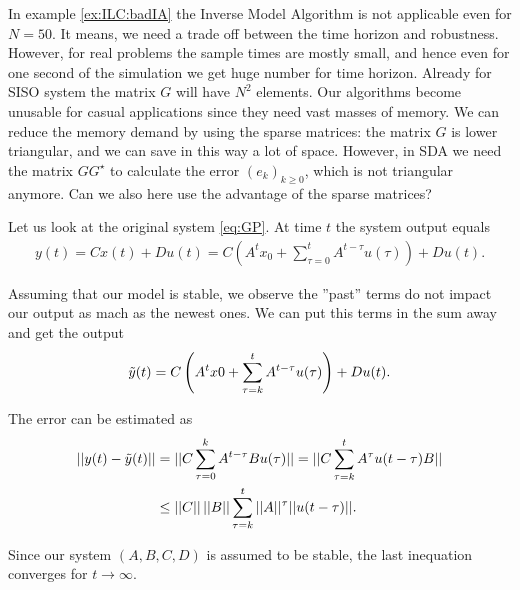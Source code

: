 	In example \ref{ex:ILC:badIA} the Inverse Model Algorithm is not applicable even for $N = 50$. 
	It means, we need a trade off between the time horizon and robustness.
	However, for real problems the sample times are mostly small, and hence even for one second of the simulation we get huge number for time horizon. Already for SISO system the matrix $G$ will have $N^2$ elements. Our algorithms become unusable for casual applications since they need vast masses of memory.	We can reduce the memory demand by using the sparse matrices: the matrix $G$ is lower triangular, and we can save in this way a lot of space. However, in SDA we need the matrix $G G^{\star}$ to calculate the error $(e_k)_{k\geq0}$, which is not triangular anymore. Can we also here use the advantage of the sparse matrices? 
	
	Let us look at the original system \ref{eq:GP}. At time $t$ the system output equals 
	\begin{align}
	y(t) = C x(t) + D u(t) = C(A^t x_0 + \sum_{\tau = 0}^t A^{t - \tau} u(\tau)) + D u(t).
	\end{align}
	
	Assuming that our model is stable,  we observe the ''past'' terms do not impact our output as mach as the newest ones. We can put this terms in the sum away and get the output 
	\begin{align}
	\tilde{y}(t) = C\left(A^t x0 + \sum_{\tau = k}^t A^{t - \tau} u(\tau)\right) + D u(t). 
	\end{align}
	
	The error can be estimated as 
	\begin{align}
	||y(t) - \tilde{y}(t)|| &= ||C \sum_{\tau = 0}^k A^{t - \tau} B u(\tau)|| = 
	||C \sum_{\tau = k}^t A^\tau u(t - \tau) B|| \\ \nonumber
	&\leq ||C|| \, ||B|| \sum_{\tau = k}^t||A||^\tau ||u(t - \tau)||.
	\end{align}
	
	
	Since our system $(A,B,C,D)$ is assumed to be stable, the last inequation converges for $t \to \infty$.
	

